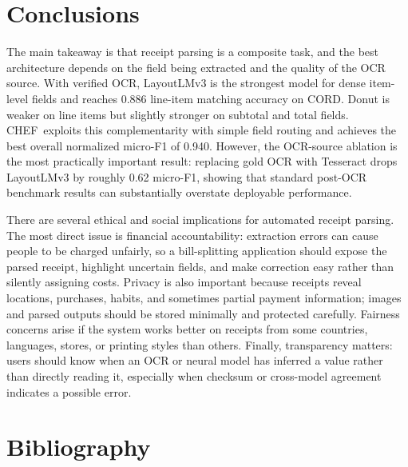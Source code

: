 \documentclass[9pt,twocolumn,twoside]{extarticle}
\newcommand{\cord}{\textsc{CORD}}
\newcommand{\chef}{\textsc{CHEF}}
\begin{document}
\section{Conclusions}
\label{sec:conclusion}

The main takeaway is that receipt parsing is a composite task, and the best architecture depends on the field being extracted and the quality of the OCR source. With verified OCR, LayoutLMv3 is the strongest model for dense item-level fields and reaches 0.886 line-item matching accuracy on \cord. Donut is weaker on line items but slightly stronger on subtotal and total fields. \chef\ exploits this complementarity with simple field routing and achieves the best overall normalized micro-F1 of 0.940. However, the OCR-source ablation is the most practically important result: replacing gold OCR with Tesseract drops LayoutLMv3 by roughly 0.62 micro-F1, showing that standard post-OCR benchmark results can substantially overstate deployable performance.

There are several ethical and social implications for automated receipt parsing. The most direct issue is financial accountability: extraction errors can cause people to be charged unfairly, so a bill-splitting application should expose the parsed receipt, highlight uncertain fields, and make correction easy rather than silently assigning costs. Privacy is also important because receipts reveal locations, purchases, habits, and sometimes partial payment information; images and parsed outputs should be stored minimally and protected carefully. Fairness concerns arise if the system works better on receipts from some countries, languages, stores, or printing styles than others. Finally, transparency matters: users should know when an OCR or neural model has inferred a value rather than directly reading it, especially when checksum or cross-model agreement indicates a possible error.

\section{Bibliography}
\end{document}

